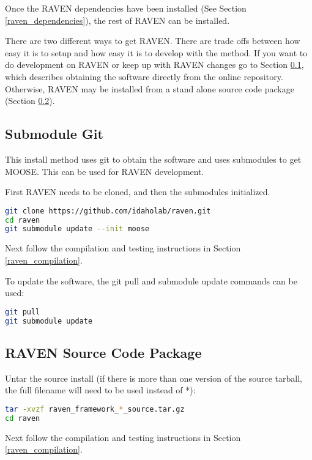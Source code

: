 Once the RAVEN dependencies have been installed (See Section
\ref{raven_dependencies}), the rest of RAVEN can be installed.

There are two different ways to get RAVEN.  There are trade offs
between how easy it is to setup and how easy it is to develop with the
method.  If you want to do development on RAVEN or keep up with RAVEN
changes go to Section \ref{submodule_git}, which describes obtaining
the software directly from the online repository.  Otherwise, RAVEN
may be installed from a stand alone source code package (Section
\ref{raven_source_package}).


\subsection{Submodule Git}
\label{submodule_git}

This install method uses git to obtain the software and uses
submodules to get MOOSE.  This can be used for RAVEN development.

First RAVEN needs to be cloned, and then the submodules initialized.

\begin{lstlisting}[language=bash]
git clone https://github.com/idaholab/raven.git
cd raven
git submodule update --init moose
\end{lstlisting}

Next follow the compilation and testing instructions in Section \ref{raven_compilation}.

To update the software, the git pull and submodule update commands can
be used:

\begin{lstlisting}[language=bash]
git pull
git submodule update
\end{lstlisting}


\subsection{RAVEN Source Code Package}
\label{raven_source_package}

Untar the source install (if there is more than one version of the
source tarball, the full filename will need to be used instead of *):

\begin{lstlisting}[language=bash]
tar -xvzf raven_framework_*_source.tar.gz
cd raven
\end{lstlisting}

Next follow the compilation and testing instructions in Section
\ref{raven_compilation}.

